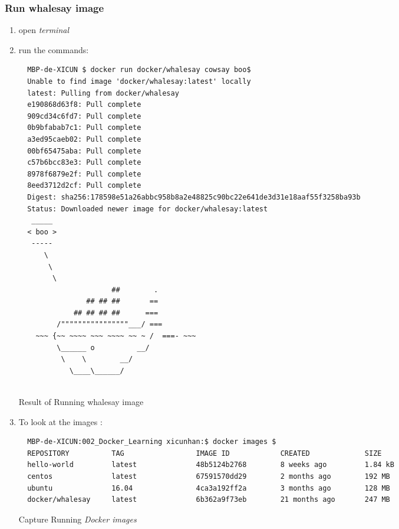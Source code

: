 \documentclass[12pt,a4paper]{article}
\begin{document}
\subsubsection{Run whalesay image}

\begin{enumerate}
  \item open \textit{terminal}
  \item run the commands: {}

  \begin{listing}[ht]
   \begin{verbatim}
  MBP-de-XICUN $ docker run docker/whalesay cowsay boo$
  Unable to find image 'docker/whalesay:latest' locally
  latest: Pulling from docker/whalesay
  e190868d63f8: Pull complete
  909cd34c6fd7: Pull complete
  0b9bfabab7c1: Pull complete
  a3ed95caeb02: Pull complete
  00bf65475aba: Pull complete
  c57b6bcc83e3: Pull complete
  8978f6879e2f: Pull complete
  8eed3712d2cf: Pull complete
  Digest: sha256:178598e51a26abbc958b8a2e48825c90bc22e641de3d31e18aaf55f3258ba93b
  Status: Downloaded newer image for docker/whalesay:latest
   _____
  < boo >
   -----
      \
       \
        \
                      ##        .
                ## ## ##       ==
             ## ## ## ##      ===
         /""""""""""""""""___/ ===
    ~~~ {~~ ~~~~ ~~~ ~~~~ ~~ ~ /  ===- ~~~
         \______ o          __/
          \    \        __/
            \____\______/


  \end{verbatim}
  \label{code:3}
  \caption{Result of Running whalesay image}
   \end{listing}
  \FloatBarrier

  \item To look at the images : \textit{{\color{violet}{docker images}}}

  \begin{listing}[ht]
   \begin{verbatim}
  MBP-de-XICUN:002_Docker_Learning xicunhan:$ docker images $
  REPOSITORY          TAG                 IMAGE ID            CREATED             SIZE
  hello-world         latest              48b5124b2768        8 weeks ago         1.84 kB
  centos              latest              67591570dd29        2 months ago        192 MB
  ubuntu              16.04               4ca3a192ff2a        3 months ago        128 MB
  docker/whalesay     latest              6b362a9f73eb        21 months ago       247 MB
  \end{verbatim}
  \label{code:4}
  \caption{Capture Running \textit{Docker images}}
   \end{listing}
  \FloatBarrier


\end{enumerate}
\end{document}
